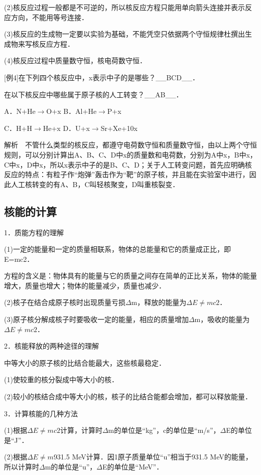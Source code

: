 (2)核反应过程一般都是不可逆的，所以核反应方程只能用单向箭头连接并表示反应方向，不能用等号连接．

(3)核反应的生成物一定要以实验为基础，不能凭空只依据两个守恒规律杜撰出生成物来写核反应方程．

(4)核反应过程中质量数守恒，核电荷数守恒．

{[}例4{]}在下列四个核反应中，x表示中子的是哪些？\_\_BCD\_\_．

在以下核反应中哪些属于原子核的人工转变？\_\_AB\_\_．

A．N+He$\rightarrow$O+x B．Al+He$\rightarrow$P+x

C．H+H$\rightarrow$He+x D．U+x$\rightarrow$Sr+Xe+10x

解析　不管什么类型的核反应，都遵守电荷数守恒和质量数守恒，由以上两个守恒规则，可以分别计算出A、B、C、D中x的质量数和电荷数，分别为A中x，B中x，C中x，D中x，所以x表示中子的是B、C、D；关于人工转变问题，首先应明确核反应的特点：有粒子作``炮弹''轰击作为``靶''的原子核，并且能在实验室中进行，因此人工核转变的有A、B，C叫轻核聚变，D叫重核裂变．
\newpage
\subsection{核能的计算}

1．质能方程的理解

(1)一定的能量和一定的质量相联系，物体的总能量和它的质量成正比，即E=mc2．

方程的含义是：物体具有的能量与它的质量之间存在简单的正比关系，物体的能量增大，质量也增大；物体的能量减少，质量也减少．

(2)核子在结合成原子核时出现质量亏损$\Delta$m，释放的能量为$\Delta E\neq mc2$．

(3)原子核分解成核子时要吸收一定的能量，相应的质量增加$\Delta$m，吸收的能量为$\Delta E\neq mc2$．

2．核能释放的两种途径的理解

中等大小的原子核的比结合能最大，这些核最稳定．

(1)使较重的核分裂成中等大小的核．

(2)较小的核结合成中等大小的核，核子的比结合能都会增加，都可以释放能量．

3．计算核能的几种方法

(1)根据$\Delta E\neq mc2$计算，计算时$\Delta$m的单位是``kg''，c的单位是``m/s''，$\Delta$E的单位是``J''．

(2)根据$\Delta E\neq m$931.5 MeV计算．因1原子质量单位``u''相当于931.5
MeV的能量，所以计算时$\Delta$m的单位是``u''，$\Delta$E的单位是``MeV''．

